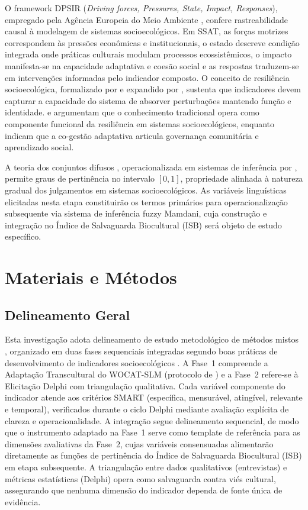 O framework DPSIR (\textit{Driving forces, Pressures, State, Impact, Responses}), empregado pela Agência Europeia do Meio Ambiente \cite{Smeets1999}, confere rastreabilidade causal à modelagem de sistemas socioecológicos. Em SSAT, as forças motrizes correspondem às pressões econômicas e institucionais, o estado descreve condição integrada onde práticas culturais modulam processos ecossistêmicos, o impacto manifesta-se na capacidade adaptativa e coesão social e as respostas traduzem-se em intervenções informadas pelo indicador composto. O conceito de resiliência socioecológica, formalizado por  e expandido por , sustenta que indicadores devem capturar a capacidade do sistema de absorver perturbações mantendo função e identidade.  e  argumentam que o conhecimento tradicional opera como componente funcional da resiliência em sistemas socioecológicos, enquanto  indicam que a co-gestão adaptativa articula governança comunitária e aprendizado social.

A teoria dos conjuntos difusos \cite{Zadeh1965}, operacionalizada em sistemas de inferência por , permite graus de pertinência no intervalo $[0,1]$, propriedade alinhada à natureza gradual dos julgamentos em sistemas socioecológicos. As variáveis linguísticas elicitadas nesta etapa constituirão os termos primários para operacionalização subsequente via sistema de inferência fuzzy Mamdani, cuja construção e integração no Índice de Salvaguarda Biocultural (ISB) será objeto de estudo específico.


\section{Materiais e Métodos}

\subsection{Delineamento Geral}

Esta investigação adota delineamento de estudo metodológico de métodos mistos \cite{Creswell2018}, organizado em duas fases sequenciais integradas segundo boas práticas de desenvolvimento de indicadores socioecológicos \cite{Dale2001,Niemeijer2008}. A Fase~1 compreende a Adaptação Transcultural do WOCAT-SLM (protocolo de ) e a Fase~2 refere-se à Elicitação Delphi com triangulação qualitativa. Cada variável componente do indicador atende aos critérios SMART (específica, mensurável, atingível, relevante e temporal), verificados durante o ciclo Delphi mediante avaliação explícita de clareza e operacionalidade. A integração segue delineamento sequencial, de modo que o instrumento adaptado na Fase~1 serve como template de referência para as dimensões avaliativas da Fase~2, cujas variáveis consensuadas alimentarão diretamente as funções de pertinência do Índice de Salvaguarda Biocultural (ISB) em etapa subsequente. A triangulação entre dados qualitativos (entrevistas) e métricas estatísticas (Delphi) opera como salvaguarda contra viés cultural, assegurando que nenhuma dimensão do indicador dependa de fonte única de evidência.

